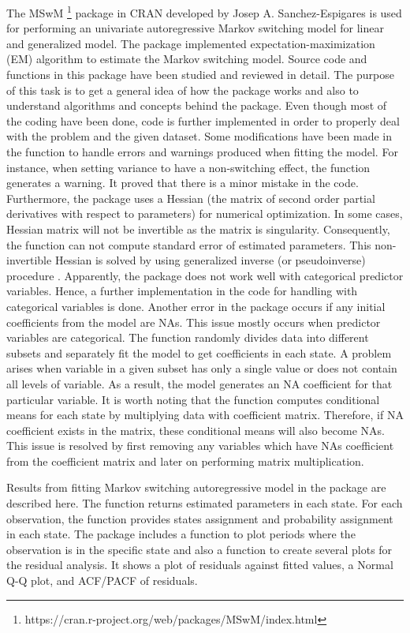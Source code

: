 \documentclass[]{article}
\begin{document}
The MSwM \footnote{https://cran.r-project.org/web/packages/MSwM/index.html} package in CRAN developed by Josep A. Sanchez-Espigares is used for performing an univariate autoregressive Markov switching model for linear and generalized model. The package implemented expectation-maximization (EM) algorithm to estimate the Markov switching model. Source code and functions in this package have been studied and reviewed in detail. The purpose of this task is to get a general idea of how the package works and also to understand algorithms and concepts behind the package. Even though most of the coding have been done, code is further implemented in order to properly deal with the problem and the given dataset. Some modifications have been made in the function to handle errors and warnings produced when fitting the model. For instance, when setting variance to have a non-switching effect, the function generates a warning. It proved that there is a minor mistake in the code. Furthermore, the package uses a Hessian (the matrix of second order partial derivatives with respect to parameters) for numerical optimization. In some cases, Hessian matrix will not be invertible as the matrix is singularity. Consequently, the function can not compute standard error of estimated parameters. This non-invertible Hessian is solved by using generalized inverse (or pseudoinverse) procedure \cite{gill2004your}. Apparently, the package does not work well with categorical predictor variables. Hence, a further implementation in the code for handling with categorical variables is done. Another error in the package occurs if any initial coefficients from the model are NAs. This issue mostly occurs when predictor variables are categorical. The function randomly divides data into different subsets and separately fit the model to get coefficients in each state. A problem arises when variable in a given subset has only a single value or does not contain all levels of variable. As a result, the model generates an NA coefficient for that particular variable. It is worth noting that the function computes conditional means for each state by multiplying data with coefficient matrix. Therefore, if NA coefficient exists in the matrix, these conditional means will also become NAs. This issue is resolved by first removing any variables which have NAs coefficient from the coefficient matrix and later on performing matrix multiplication. 

Results from fitting Markov switching autoregressive model in the package are described here. The function returns estimated parameters in each state. For each observation, the function provides states assignment and probability assignment in each state. The package includes a function to plot periods where the observation is in the specific state and also a function to create several plots for the residual analysis. It shows a plot of residuals against fitted values, a Normal Q-Q plot, and ACF/PACF of residuals.



\end{document}
